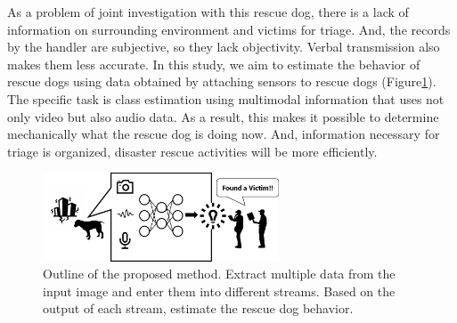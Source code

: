 \documentclass[MIRU,submit,english]{miru2019e}
\begin{document}
As a problem of joint investigation with this rescue dog, there is a lack of information on surrounding environment and victims for triage.
And, the records by the handler are subjective, so they lack objectivity. Verbal transmission also makes them less accurate.
In this study, we aim to estimate the behavior of rescue dogs using data obtained by attaching sensors to rescue dogs (Figure\ref{lite_model}).
The specific task is class estimation using multimodal information that uses not only video but also audio data.
As a result, this makes it possible to determine mechanically what the rescue dog is doing now.
And, information necessary for triage is organized, disaster rescue activities will be more efficiently.

\begin{figure}[tb]
 \begin{center}
  \includegraphics[width=7cm]{./Figures/dogactrec.eps}
  \caption{Outline of the proposed method. Extract multiple data from the input image and enter them into different streams. Based on the output of each stream, estimate the rescue dog behavior.}

  \label{lite_model}
 \end{center}
\end{figure}
\end{document}
